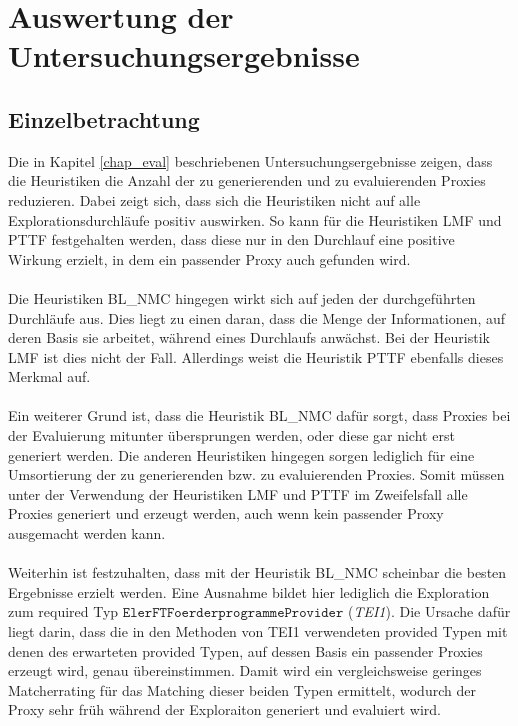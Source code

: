 \section{Auswertung der Untersuchungsergebnisse}
\subsection{Einzelbetrachtung}\label{disc_einzel}
Die in Kapitel \ref{chap_eval} beschriebenen Untersuchungsergebnisse zeigen, dass die Heuristiken die Anzahl der zu generierenden und zu evaluierenden Proxies reduzieren. Dabei zeigt sich, dass sich die Heuristiken nicht auf alle Explorationsdurchläufe positiv auswirken. So kann für die Heuristiken LMF und PTTF festgehalten werden, dass diese nur in den Durchlauf eine positive Wirkung erzielt, in dem ein passender Proxy auch gefunden wird.
\\\\
Die Heuristiken BL\_NMC hingegen wirkt sich auf jeden der durchgeführten Durchläufe aus. Dies liegt zu einen daran, dass die Menge der Informationen, auf deren Basis sie arbeitet, während eines Durchlaufs anwächst. Bei der Heuristik LMF ist dies nicht der Fall. Allerdings weist die Heuristik PTTF ebenfalls dieses Merkmal auf.
\\\\
Ein weiterer Grund ist, dass die Heuristik BL\_NMC dafür sorgt, dass Proxies bei der Evaluierung mitunter übersprungen werden, oder diese gar nicht erst generiert werden. Die anderen Heuristiken hingegen sorgen lediglich für eine Umsortierung der zu generierenden bzw. zu evaluierenden Proxies. Somit müssen unter der Verwendung der Heuristiken LMF und PTTF im Zweifelsfall alle Proxies generiert und erzeugt werden, auch wenn kein passender Proxy ausgemacht werden kann.
\\\\
Weiterhin ist festzuhalten, dass mit der Heuristik BL\_NMC scheinbar die besten Ergebnisse erzielt werden. Eine Ausnahme bildet hier lediglich die Exploration zum required Typ $\texttt{ElerFTFoerderprogrammeProvider}$ (\emph{TEI1}). Die Ursache dafür liegt darin, dass die in den Methoden von TEI1 verwendeten provided Typen mit denen des erwarteten provided Typen, auf dessen Basis ein passender Proxies erzeugt wird, genau übereinstimmen. Damit wird ein vergleichsweise geringes Matcherrating für das Matching dieser beiden Typen ermittelt, wodurch der Proxy sehr früh während der Exploraiton generiert und evaluiert wird.
